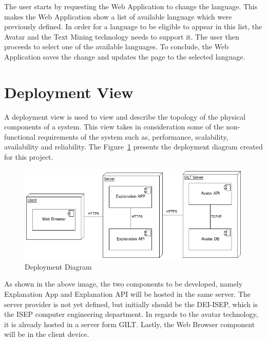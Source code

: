 The user starts by requesting the Web Application to change the language.
This makes the Web Application show a list of available language which were previously defined.
In order for a language to be eligible to appear in this list, the Avatar and the Text Mining technology needs to support it.
The user then proceeds to select one of the available languages.
To conclude, the Web Application saves the change and updates the page to the selected language.

\section{Deployment View}

A deployment view is used to view and describe the topology of the physical components of a system.
This view takes in consideration some of the non-functional requirements of the system such as, performance, scalability, availability and reliability.
The Figure~\ref{fig:deploy} presents the deployment diagram created for this project.

\begin{figure}[H]
\centering
\includegraphics[width=\textwidth,keepaspectratio]{ch4/assets/deployment_diagram.png}
\caption[Deployment Diagram]{Deployment Diagram}
\label{fig:deploy}
\end{figure}

As shown in the above image, the two components to be developed, namely Explanation App and Explanation API will be hosted in the same server.
The server provider is not yet defined, but initially should be the DEI-ISEP, which is the ISEP computer engineering department.
In regards to the avatar technology, it is already hosted in a server form GILT.
Lastly, the Web Browser component will be in the client device.
